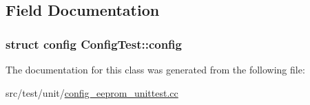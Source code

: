 \subsection{Field Documentation}
\hypertarget{classConfigTest_a1b72ace46c024224bbc34bcc23781346}{
\subsubsection[{config}]{\setlength{\rightskip}{0pt plus 5cm}struct {\bf config} Config\+Test\+::config\hspace{0.3cm}{\ttfamily [protected]}}}\label{classConfigTest_a1b72ace46c024224bbc34bcc23781346}


The documentation for this class was generated from the following file\+:\begin{DoxyCompactItemize}
\item 
src/test/unit/\hyperlink{config__eeprom__unittest_8cc}{config\+\_\+eeprom\+\_\+unittest.\+cc}\end{DoxyCompactItemize}

